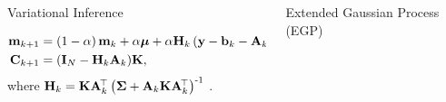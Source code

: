 \documentclass[final]{beamer}
\newlength{\onecolwid}
\newlength{\twocolwid}
\begin{document}
\begin{frame}[t]
\begin{columns}[t]
\begin{column}{\twocolwid}
\begin{columns}[t,totalwidth=\twocolwid]
\begin{column}{\onecolwid}
\begin{block}{Variational Inference}
\begin{enumerate}
\begin{align*}
 \mathbf{m}_{k+1} &= \left({1-\alpha}\right)\mathbf{m}_k + \alpha\boldsymbol{\mu} 
        + \alpha\mathbf{H}_k\left({\mathbf{y} - \mathbf{b}_k - \mathbf{A}_k\boldsymbol{\mu}}\right) \text{,} \\
    \mathbf{C}_{k+1}   &= \left({\mathbf{I}_{N} - \mathbf{H}_k\mathbf{A}_k}\right)\!\mathbf{K},   
  \end{align*}        
where     $ \mathbf{H}_k = \mathbf{K}\mathbf{A}_k^{\!\top}\left({\boldsymbol{\Sigma} +
        \mathbf{A}_k\mathbf{K}\mathbf{A}_k^{\!\top}}\right)^{\text{-}1}$ .  
\end{enumerate}
%

\end{block}




\end{column} %

\begin{column}{\onecolwid}\vspace{-.6in} %



\begin{block}{Extended Gaussian Process (EGP)}
    

\end{block}
\end{column}
\end{columns}
\end{column}
\end{columns}
\end{frame}
\end{document}
